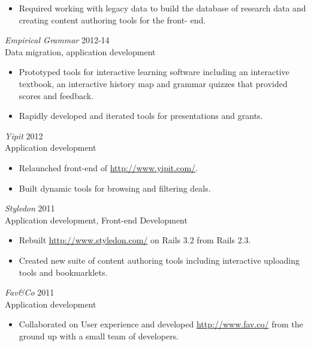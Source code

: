 \documentclass[line,margin]{res}
\begin{document}
\begin{resume}
\begin{itemize}
        \item
            Required working with legacy data to build the database of
            research data and creating content authoring tools for the front-
            end.
    \end{itemize}

    \begin{samepage}
    {\sl Empirical Grammar}
    \hfill 2012-14 \\
    Data migration, application development
    \begin{itemize} \itemsep -2pt
        \item
            Prototyped tools for interactive learning software including an
            interactive textbook, an interactive history map and grammar
            quizzes that provided scores and feedback.

        \item
            Rapidly developed and iterated tools for presentations and grants.
    \end{itemize}
    \end{samepage}


    \begin{samepage}
    {\sl Yipit}
    \hfill 2012 \\
    Application development
    \begin{itemize} \itemsep -2pt
        \item
            Relaunched front-end of \url{http://www.yipit.com/}.

        \item
            Built dynamic tools for browsing and filtering deals.
    \end{itemize}
    \end{samepage}

    {\sl Styledon}
    \hfill 2011 \\
    Application development, Front-end Development
    \begin{itemize} \itemsep -2pt
        \item
            Rebuilt \url{http://www.styledon.com/} on Rails 3.2 from Rails
            2.3.

        \item
            Created new suite of content authoring tools including interactive
            uploading tools and bookmarklets.
    \end{itemize}

    {\sl Fav\&Co}
    \hfill 2011 \\
    Application development
    \begin{itemize} \itemsep -2pt
        \item
            Collaborated on User experience and developed
            \url{http://www.fav.co/} from the ground up with a small team of
            developers.


\end{itemize}
\end{resume}
\end{document}
